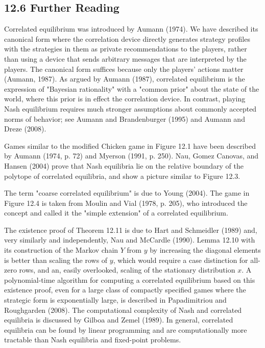 \documentclass[12pt]{article}
\begin{document}
\subsection*{12.6 Further Reading}
Correlated equilibrium was introduced by Aumann (1974). We have described its canonical form where the correlation device directly generates strategy profiles with the strategies in them as private recommendations to the players, rather than using a device that sends arbitrary messages that are interpreted by the players. The canonical form suffices because only the players' actions matter (Aumann, 1987). As argued by Aumann (1987), correlated equilibrium is the expression of "Bayesian rationality" with a "common prior" about the state of the world, where this prior is in effect the correlation device. In contrast, playing Nash equilibrium requires much stronger assumptions about commonly accepted norms of behavior; see Aumann and Brandenburger (1995) and Aumann and Dreze (2008).

Games similar to the modified Chicken game in Figure 12.1 have been described by Aumann (1974, p. 72) and Myerson (1991, p. 250). Nau, Gomez Canovas, and Hansen (2004) prove that Nash equilibria lie on the relative boundary of the polytope of correlated equilibria, and show a picture similar to Figure 12.3.

The term "coarse correlated equilibrium" is due to Young (2004). The game in Figure 12.4 is taken from Moulin and Vial (1978, p. 205), who introduced the concept and called it the "simple extension" of a correlated equilibrium.

The existence proof of Theorem 12.11 is due to Hart and Schmeidler (1989) and, very similarly and independently, Nau and McCardle (1990). Lemma 12.10 with its construction of the Markov chain $Y$ from $y$ by increasing the diagonal elements is better than scaling the rows of $y$, which would require a case distinction for all-zero rows, and an, easily overlooked, scaling of the stationary distribution $x$. A polynomial-time algorithm for computing a correlated equilibrium based on this existence proof, even for a large class of compactly specified games where the strategic form is exponentially large, is described in Papadimitriou and Roughgarden (2008). The computational complexity of Nash and correlated equilibria is discussed by Gilboa and Zemel (1989). In general, correlated equilibria can be found by linear programming and are computationally more tractable than Nash equilibria and fixed-point problems.
\end{document}
